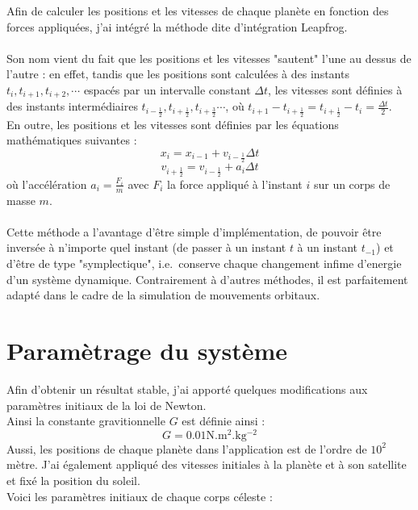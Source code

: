 \documentclass{article}
\begin{document}
Afin de calculer les positions et les vitesses de chaque planète en fonction des forces appliquées, j'ai intégré la méthode dite d'intégration Leapfrog.\\\\
Son nom vient du fait que les positions et les vitesses "sautent" l'une au dessus de l'autre : en effet, tandis que les positions sont calculées à des instants $t_i, t_{i+1}, t_{i+2}, \cdots$ espacés par un intervalle constant $\Delta t$, les vitesses sont définies à des instants intermédiaires $t_{i-\frac{1}{2}}, t_{i+\frac{1}{2}}, t_{i+\frac{3}{2}} \cdots$, où $t_{i+1} - t_{i+\frac{1}{2}} = t_{i+\frac{1}{2}} - t_i = \frac{\Delta t}{2}$.\\
En outre, les positions et les vitesses sont définies par les équations mathématiques suivantes :
\[ x_{i}  = x_{i-1} + v_{i-\frac{1}{2}}\Delta t\]
\[ v_{i+\frac{1}{2}}  = v_{i-\frac{1}{2}} + a_{i}\Delta t\]
où l'accélération $a_{i} = \frac{F_{i}}{m}$ avec $F_{i}$ la force appliqué à l'instant $i$ sur un corps de masse $m$.
\\\\
Cette méthode a l'avantage d'être simple d'implémentation, de pouvoir être inversée à n'importe quel instant (de passer à un instant $t$ à un instant $t_{-1}$) et d'être de type "symplectique", i.e.\ conserve chaque changement infime d'energie d'un système dynamique. Contrairement à d'autres méthodes, il est parfaitement adapté dans le cadre de la simulation de mouvements orbitaux. 

\section*{Paramètrage du système}

Afin d'obtenir un résultat stable, j'ai apporté quelques modifications aux paramètres initiaux de la loi de Newton.\\
Ainsi la constante gravitionnelle $G$ est définie ainsi :
\[ G = 0.01 \mathrm{N.m^2.kg^{-2}}\] 
Aussi, les positions de chaque planète dans l'application est de l'ordre de $10^2$ mètre.
J'ai également appliqué des vitesses initiales à la planète et à son satellite et fixé la position du soleil.\\
Voici les paramètres initiaux de chaque corps céleste :
\end{document}

